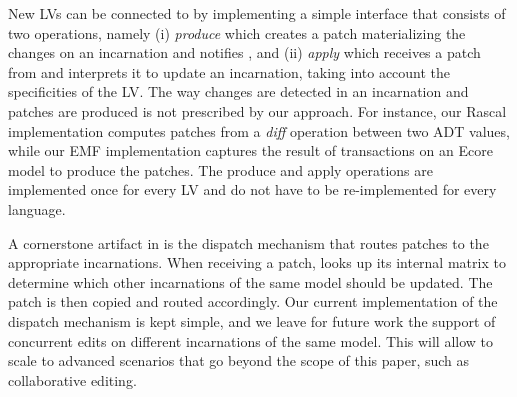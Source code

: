 New LVs can be connected to \prism by implementing a simple interface that consists of two operations, namely (i) \emph{produce} which creates a patch materializing the changes on an incarnation and notifies \prism, and (ii) \emph{apply} which receives a patch from \prism and interprets it to update an incarnation, taking into account the specificities of the LV.
The way changes are detected in an incarnation and patches are produced is not prescribed by our approach.
For instance, our Rascal implementation computes patches from a \emph{diff} operation between two ADT values, while our EMF implementation captures the result of transactions on an Ecore model to produce the patches.
The produce and apply operations are implemented once for every LV and do not have to be re-implemented for every language.

A cornerstone artifact in \prism is the dispatch mechanism that routes patches to the appropriate incarnations.
When receiving a patch, \prism looks up its internal matrix to determine which other incarnations of the same model should be updated.
The patch is then copied and routed accordingly.
Our current implementation of the dispatch mechanism is kept simple, and we leave for future work the support of concurrent edits on different incarnations of the same model. This will allow \prism to scale to advanced scenarios that go beyond the scope of this paper, such as collaborative editing.

